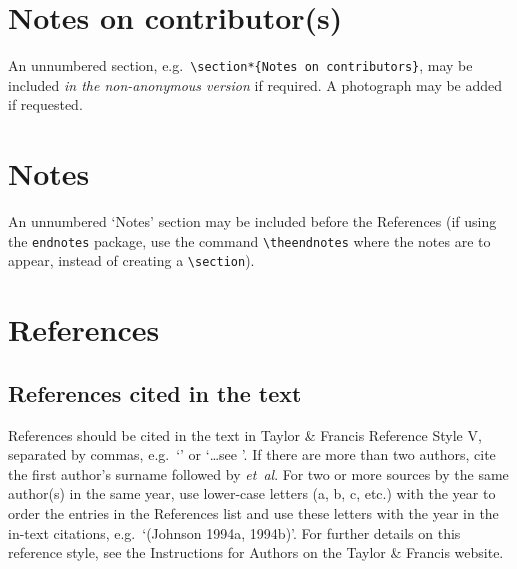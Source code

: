 \documentclass[]{interact}
\theoremstyle{plain}%
\theoremstyle{definition}
\theoremstyle{remark}
\begin{document}
\section*{Notes on contributor(s)}

An unnumbered section, e.g.\ \verb"\section*{Notes on contributors}", may be included \emph{in the non-anonymous version} if required. A photograph may be added if requested.


\section*{Notes}

An unnumbered `Notes' section may be included before the References (if using the \verb"endnotes" package, use the command \verb"\theendnotes" where the notes are to appear, instead of creating a \verb"\section").


\section{References}

\subsection{References cited in the text}

References should be cited in the text in Taylor \& Francis Reference Style V, separated by commas, e.g.\ `\citep{Got89,Eva94,Azi97}' or `\ldots see \citet[p.~75]{Che51}'. If there are more than two authors, cite the first author's surname followed by \textit{et~al}. For two or more sources by the same author(s) in the same year, use lower-case letters (a, b, c, etc.) with the year to order the entries in the References list and use these letters with the year in the in-text citations, e.g.\ `(Johnson 1994a, 1994b)'. For further details on this reference style, see the Instructions for Authors on the Taylor \& Francis website.
\end{document}
